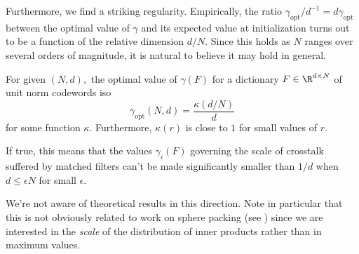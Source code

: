Furthermore, we find a striking regularity. Empirically, the ratio $\gamma_\text{opt} / d^{-1} = d \gamma_\text{opt}$ between the optimal value of $\gamma$ and its expected value at initialization turns out to be a function of the relative dimension $d/N.$ Since this holds as $N$ ranges over several orders of magnitude, it is natural to believe it may hold in general.

\begin{claim}
	For given $(N, d),$ the optimal value of $\gamma(F)$ for a dictionary $F \in \R^{d \times N}$ of unit norm codewords iso
	$$
		\gamma_\text{opt}(N, d) = \frac{\kappa(d/N)}{d}
	$$
	for some function $\kappa.$ Furthermore, $\kappa(r)$ is close to $1$ for small values of $r.$
\end{claim}

If true, this means that the values $\gamma_i(F)$ governing the scale of crosstalk suffered by matched filters can't be made significantly smaller than $1/d$ when $d \le \epsilon N$ for small $\epsilon.$

We're not aware of theoretical results in this direction. Note in particular that this is not obviously related to work on sphere packing (see \cite{cohn_sphere_2014}) since we are interested in the \textit{scale} of the distribution of inner products rather than in maximum values.
